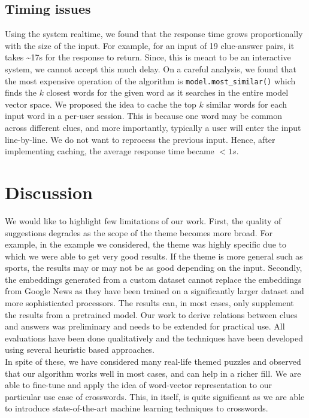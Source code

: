 \documentclass[twoside]{article}
\begin{document}
\subsection{Timing issues}
Using the system realtime, we found that the response time grows proportionally with the size of the input. For example, for an input of 19 clue-answer pairs, it takes \textasciitilde 17s for the response to return. Since, this is meant to be an interactive system, we cannot accept this much delay. On a careful analysis, we found that the most expensive operation of the algorithm is \verb|model.most_similar()| which finds the $k$ closest words for the given word as it searches in the entire model vector space. We proposed the idea to cache the top $k$ similar words for each input word in a per-user session. This is because one word may be common across different clues, and more importantly, typically a user will enter the input line-by-line. We do not want to reprocess the previous input. Hence, after implementing caching, the average response time became $< 1 s$.

\section{Discussion}
\label{sec:sec7}
We would like to highlight few limitations of our work. First, the quality of suggestions degrades as the scope of the theme becomes more broad. For example, in the example we considered, the theme was highly specific due to which we were able to get very good results. If the theme is more general such as sports, the results may or may not be as good depending on the input. Secondly, the embeddings generated from a custom dataset cannot replace the embeddings from Google News as they have been trained on a significantly larger dataset and more sophisticated processors. The results can, in most cases, only supplement the results from a pretrained model. 
Our work to derive relations between clues and answers was preliminary and needs to be extended for practical use. All evaluations have been done qualitatively and the techniques have been developed using several heuristic based approaches.\\ In spite of these, we have considered many real-life themed puzzles and observed that our algorithm works well in most cases, and can help in a richer fill. We are able to fine-tune and apply the idea of word-vector representation to our particular use case of crosswords.  This, in itself, is quite significant as we are able to introduce state-of-the-art machine learning techniques to crosswords.
\end{document}
